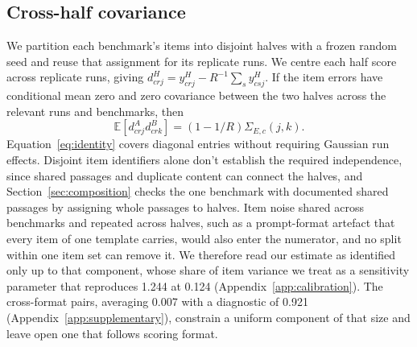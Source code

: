 \subsection{Cross-half covariance}
We partition each benchmark's items into disjoint halves with a frozen random seed and reuse that assignment for its replicate runs. We centre each half score across replicate runs, giving $d^H_{crj}=y^H_{crj}-R^{-1}\sum_s y^H_{csj}$. If the item errors have conditional mean zero and zero covariance between the two halves across the relevant runs and benchmarks, then
\begin{equation}
\mathbb{E}[d^A_{crj}d^B_{crk}]=(1-1/R)\Sigma_{E,c}(j,k).
\label{eq:identity}
\end{equation}
Equation~\ref{eq:identity} covers diagonal entries without requiring Gaussian run effects. Disjoint item identifiers alone don't establish the required independence, since shared passages and duplicate content can connect the halves, and Section~\ref{sec:composition} checks the one benchmark with documented shared passages by assigning whole passages to halves. Item noise shared across benchmarks and repeated across halves, such as a prompt-format artefact that every item of one template carries, would also enter the numerator, and no split within one item set can remove it. We therefore read our estimate as identified only up to that component, whose share of item variance we treat as a sensitivity parameter that reproduces 1.244 at 0.124 (Appendix~\ref{app:calibration}). The cross-format pairs, averaging 0.007 with a diagnostic of 0.921 (Appendix~\ref{app:supplementary}), constrain a uniform component of that size and leave open one that follows scoring format.


